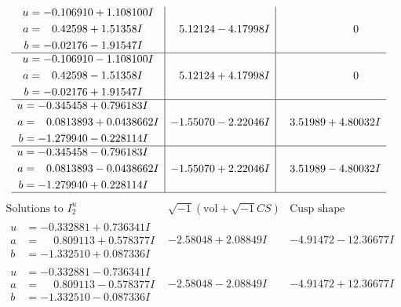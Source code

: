 \documentclass[1p]{elsarticle_modified}
\theoremstyle{definition}
\newcommand{\I}{\sqrt{-1}}
\begin{document}
$$\begin{array}{c|c|c}
\begin{aligned}
u &= -0.106910 + 1.108100 I \\
a &= \phantom{-}0.42598 + 1.51358 I \\
b &= -0.02176 - 1.91547 I\end{aligned}
 & \phantom{-}5.12124 - 4.17998 I & \phantom{-0.000000 } 0 \\ \hline\begin{aligned}
u &= -0.106910 - 1.108100 I \\
a &= \phantom{-}0.42598 - 1.51358 I \\
b &= -0.02176 + 1.91547 I\end{aligned}
 & \phantom{-}5.12124 + 4.17998 I & \phantom{-0.000000 } 0 \\ \hline\begin{aligned}
u &= -0.345458 + 0.796183 I \\
a &= \phantom{-}0.0813893 + 0.0438662 I \\
b &= -1.279940 - 0.228114 I\end{aligned}
 & -1.55070 - 2.22046 I & \phantom{-}3.51989 + 4.80032 I \\ \hline\begin{aligned}
u &= -0.345458 - 0.796183 I \\
a &= \phantom{-}0.0813893 - 0.0438662 I \\
b &= -1.279940 + 0.228114 I\end{aligned}
 & -1.55070 + 2.22046 I & \phantom{-}3.51989 - 4.80032 I\\
 \hline 
 \end{array}$$\newpage$$\begin{array}{c|c|c}  
\text{Solutions to }I^u_{2}& \I (\text{vol} + \sqrt{-1}CS) & \text{Cusp shape}\\
 \hline 
\begin{aligned}
u &= -0.332881 + 0.736341 I \\
a &= \phantom{-}0.809113 + 0.578377 I \\
b &= -1.332510 + 0.087336 I\end{aligned}
 & -2.58048 + 2.08849 I & -4.91472 - 12.36677 I \\ \hline\begin{aligned}
u &= -0.332881 - 0.736341 I \\
a &= \phantom{-}0.809113 - 0.578377 I \\
b &= -1.332510 - 0.087336 I\end{aligned}
 & -2.58048 - 2.08849 I & -4.91472 + 12.36677 I \\ \hline\begin{aligned}

\end{aligned}
\end{array}$$
\end{document}
